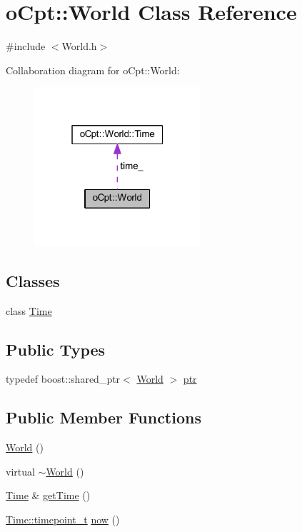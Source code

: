 \hypertarget{classo_cpt_1_1_world}{}\section{o\+Cpt\+:\+:World Class Reference}
\label{classo_cpt_1_1_world}


{\ttfamily \#include $<$World.\+h$>$}



Collaboration diagram for o\+Cpt\+:\+:World\+:
\nopagebreak
\begin{figure}[H]
\begin{center}
\leavevmode
\includegraphics[width=175pt]{classo_cpt_1_1_world__coll__graph}
\end{center}
\end{figure}
\subsection*{Classes}
\begin{DoxyCompactItemize}
\item 
class \hyperlink{classo_cpt_1_1_world_1_1_time}{Time}
\end{DoxyCompactItemize}
\subsection*{Public Types}
\begin{DoxyCompactItemize}
\item 
typedef boost\+::shared\+\_\+ptr$<$ \hyperlink{classo_cpt_1_1_world}{World} $>$ \hyperlink{classo_cpt_1_1_world_aa6e591e3096d5de71e0cec9039663d67}{ptr}
\end{DoxyCompactItemize}
\subsection*{Public Member Functions}
\begin{DoxyCompactItemize}
\item 
\hyperlink{classo_cpt_1_1_world_adc3d3e562ec4f5979b8da40bf8bef36c}{World} ()
\item 
virtual \hyperlink{classo_cpt_1_1_world_a74dd3c254805c7dd16353b7b7e93dc45}{$\sim$\+World} ()
\item 
\hyperlink{classo_cpt_1_1_world_1_1_time}{Time} \& \hyperlink{classo_cpt_1_1_world_a505f4c14270cfd34d806bd04c4b67f95}{get\+Time} ()
\item 
\hyperlink{classo_cpt_1_1_world_1_1_time_a6a6e782c3c90622c1c7070b0a223ec4c}{Time\+::timepoint\+\_\+t} \hyperlink{classo_cpt_1_1_world_a82235ee23e403f81d38c04b813cdeb23}{now} ()
\end{DoxyCompactItemize}
